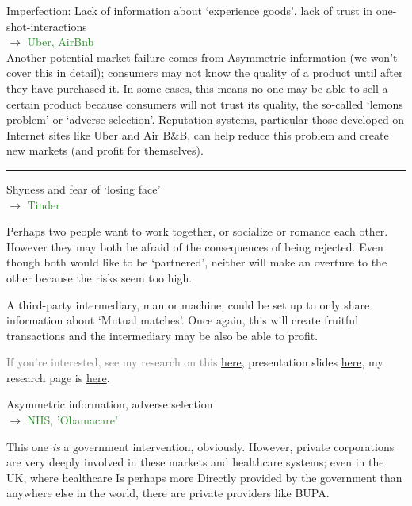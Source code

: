 \documentclass[]{article}
\begin{document}
Imperfection: Lack of information about `experience goods', lack of
trust in one-shot-interactions\\

\(\rightarrow\) \textcolor{ForestGreen}{Uber, AirBnb}\\

Another potential market failure comes from Asymmetric information (we
won't cover this in detail); consumers may not know the quality of a
product until after they have purchased it. In some cases, this means no
one may be able to sell a certain product because consumers will not
trust its quality, the so-called `lemons problem' or `adverse
selection'. Reputation systems, particular those developed on Internet
sites like Uber and Air B\&B, can help reduce this problem and create
new markets (and profit for themselves).

\begin{center}\rule{0.5\linewidth}{\linethickness}\end{center}

Shyness and fear of `losing face'\\

\(\rightarrow\) \textcolor{ForestGreen}{Tinder}

Perhaps two people want to work together, or socialize or romance each
other. However they may both be afraid of the consequences of being
rejected. Even though both would like to be `partnered', neither will
make an overture to the other because the risks seem too high.

A third-party intermediary, man or machine, could be set up to only
share information about `Mutual matches'. Once again, this will create
fruitful transactions and the intermediary may be also be able to
profit.

\textcolor{gray}{If you're interested, see my research on this}
\href{https://www.dropbox.com/s/tx4yfun1ctxuezw/LosingFace.pdf?dl=0}{here},
presentation slides \href{http://wp.me/aZhn3-c8}{here}, my research page
is
\href{https://wordpress.com/page/davidreinstein.wordpress.com/18}{here}.

\bigskip

Asymmetric information, adverse selection\\

\(\rightarrow\) \textcolor{ForestGreen}{NHS, 'Obamacare'}

This one \emph{is} a government intervention, obviously. However,
private corporations are very deeply involved in these markets and
healthcare systems; even in the UK, where healthcare Is perhaps more
Directly provided by the government than anywhere else in the world,
there are private providers like BUPA.
\end{document}
